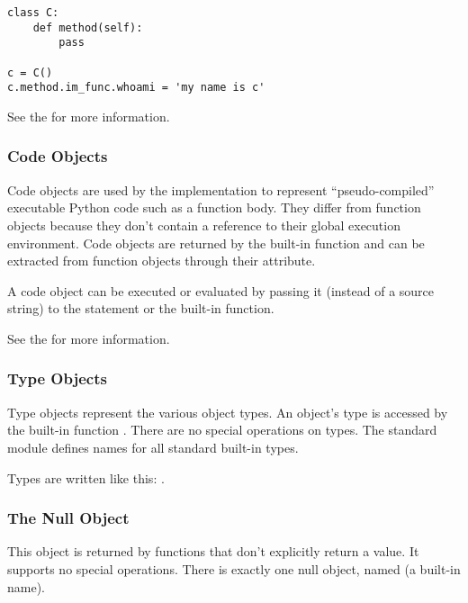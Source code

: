 \begin{verbatim}
class C:
    def method(self):
        pass

c = C()
c.method.im_func.whoami = 'my name is c'
\end{verbatim}

See the  for more
information.


\subsubsection{Code Objects \label{bltin-code-objects}}

Code objects are used by the implementation to represent
``pseudo-compiled'' executable Python code such as a function body.
They differ from function objects because they don't contain a
reference to their global execution environment.  Code objects are
returned by the built-in  function and can be
extracted from function objects through their 
attribute.

A code object can be executed or evaluated by passing it (instead of a
source string) to the  statement or the built-in
 function.

See the  for more
information.


\subsubsection{Type Objects \label{bltin-type-objects}}

Type objects represent the various object types.  An object's type is
accessed by the built-in function .  There are no special
operations on types.  The standard module  defines names
for all standard built-in types.

Types are written like this: .


\subsubsection{The Null Object \label{bltin-null-object}}

This object is returned by functions that don't explicitly return a
value.  It supports no special operations.  There is exactly one null
object, named  (a built-in name).

